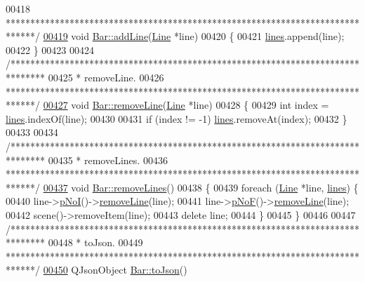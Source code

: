 \begin{DoxyCode}
00418 \textcolor{comment}{ ******************************************************************************/}
\hypertarget{bar_8cpp_source_l00419}{}\hyperlink{group___models_ga8cbd2f62d92e69ce6c8d561b682464b6}{00419} \textcolor{keywordtype}{void} \hyperlink{group___models_ga8cbd2f62d92e69ce6c8d561b682464b6}{Bar::addLine}(\hyperlink{class_line}{Line} *line)
00420 \{
00421   \hyperlink{class_bar_a23b6d4319352ef0e77ad66aade4e0209}{lines}.append(line);
00422 \}
00423 
00424 \textcolor{comment}{/*******************************************************************************}
00425 \textcolor{comment}{ * removeLine.}
00426 \textcolor{comment}{ ******************************************************************************/}
\hypertarget{bar_8cpp_source_l00427}{}\hyperlink{group___models_ga2536c0e5cb97fb627b3520826ece2c99}{00427} \textcolor{keywordtype}{void} \hyperlink{group___models_ga2536c0e5cb97fb627b3520826ece2c99}{Bar::removeLine}(\hyperlink{class_line}{Line} *line)
00428 \{
00429   \textcolor{keywordtype}{int} index = \hyperlink{class_bar_a23b6d4319352ef0e77ad66aade4e0209}{lines}.indexOf(line);
00430 
00431   \textcolor{keywordflow}{if} (index != -1) \hyperlink{class_bar_a23b6d4319352ef0e77ad66aade4e0209}{lines}.removeAt(index);
00432 \}
00433 
00434 \textcolor{comment}{/*******************************************************************************}
00435 \textcolor{comment}{ * removeLines.}
00436 \textcolor{comment}{ ******************************************************************************/}
\hypertarget{bar_8cpp_source_l00437}{}\hyperlink{group___models_ga4ea1a2074cb45968d80d6add571884a4}{00437} \textcolor{keywordtype}{void} \hyperlink{group___models_ga4ea1a2074cb45968d80d6add571884a4}{Bar::removeLines}()
00438 \{
00439   \textcolor{keywordflow}{foreach} (\hyperlink{class_line}{Line} *line, \hyperlink{class_bar_a23b6d4319352ef0e77ad66aade4e0209}{lines}) \{
00440     line->\hyperlink{group___models_gaeafd90e84ac2f8de2a879abe9e53eef3}{pNoI}()->\hyperlink{group___models_ga2536c0e5cb97fb627b3520826ece2c99}{removeLine}(line);
00441     line->\hyperlink{group___models_gabbc73ddedd3075c33ae5331bd7c9829f}{pNoF}()->\hyperlink{group___models_ga2536c0e5cb97fb627b3520826ece2c99}{removeLine}(line);
00442     scene()->removeItem(line);
00443     \textcolor{keyword}{delete} line;
00444   \}
00445 \}
00446 
00447 \textcolor{comment}{/*******************************************************************************}
00448 \textcolor{comment}{ * toJson.}
00449 \textcolor{comment}{ ******************************************************************************/}
\hypertarget{bar_8cpp_source_l00450}{}\hyperlink{group___models_ga3eb84c42b687db6cd98e11b8bd38c86e}{00450} QJsonObject \hyperlink{group___models_ga3eb84c42b687db6cd98e11b8bd38c86e}{Bar::toJson}()

\end{DoxyCode}
